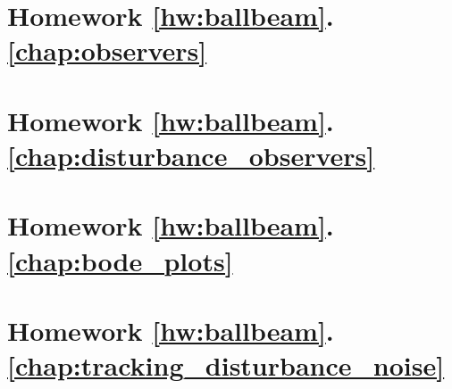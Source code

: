 	\section*{
		Homework \ref{hw:ballbeam}.\ref{chap:observers}}  \label{hw:ballbeam_observer}
		
	\section*{
		Homework \ref{hw:ballbeam}.\ref{chap:disturbance_observers}}  \label{hw:ballbeam_disturbance_observer}
		
	\section*{
		Homework \ref{hw:ballbeam}.\ref{chap:bode_plots}}  \label{hw:ballbeam_bode}
		
	\section*{
		Homework \ref{hw:ballbeam}.\ref{chap:tracking_disturbance_noise}}  \label{hw:ballbeam_loopgain}
		
